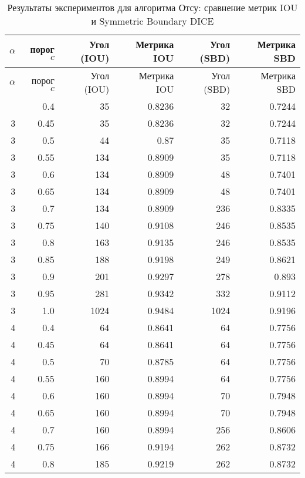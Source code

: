 
\begin{center}
\begin{longtable}{|r|r|r|r|r|r|}
\caption{Результаты экспериментов для алгоритма Отсу: сравнение метрик IOU и Symmetric Boundary DICE} 
\label{tab:otsu-split} \\
\hline
\(\alpha\) & порог \(c\) & Угол (IOU) & Метрика IOU & Угол (SBD) & Метрика SBD \\
\hline
\endfirsthead

\hline
\(\alpha\) & порог \(c\) & Угол (IOU) & Метрика IOU & Угол (SBD) & Метрика SBD \\
\hline
\endhead

\hline
\endfoot

\hline
\endlastfoot
3 & 0.4 & 35 & 0.8236 & 32 & 0.7244 \\
\hline
3 & 0.45 & 35 & 0.8236 & 32 & 0.7244 \\
\hline
3 & 0.5 & 44 & 0.87 & 35 & 0.7118 \\
\hline
3 & 0.55 & 134 & 0.8909 & 35 & 0.7118 \\
\hline
3 & 0.6 & 134 & 0.8909 & 48 & 0.7401 \\
\hline
3 & 0.65 & 134 & 0.8909 & 48 & 0.7401 \\
\hline
3 & 0.7 & 134 & 0.8909 & 236 & 0.8335 \\
\hline
3 & 0.75 & 140 & 0.9108 & 246 & 0.8535 \\
\hline
3 & 0.8 & 163 & 0.9135 & 246 & 0.8535 \\
\hline
3 & 0.85 & 188 & 0.9198 & 249 & 0.8621 \\
\hline
3 & 0.9 & 201 & 0.9297 & 278 & 0.893 \\
\hline
3 & 0.95 & 281 & 0.9342 & 332 & 0.9112 \\
\hline
3 & 1.0 & 1024 & 0.9484 & 1024 & 0.9196 \\
\hline
4 & 0.4 & 64 & 0.8641 & 64 & 0.7756 \\
\hline
4 & 0.45 & 64 & 0.8641 & 64 & 0.7756 \\
\hline
4 & 0.5 & 70 & 0.8785 & 64 & 0.7756 \\
\hline
4 & 0.55 & 160 & 0.8994 & 64 & 0.7756 \\
\hline
4 & 0.6 & 160 & 0.8994 & 70 & 0.7948 \\
\hline
4 & 0.65 & 160 & 0.8994 & 70 & 0.7948 \\
\hline
4 & 0.7 & 160 & 0.8994 & 256 & 0.8606 \\
\hline
4 & 0.75 & 166 & 0.9194 & 262 & 0.8732 \\
\hline
4 & 0.8 & 185 & 0.9219 & 262 & 0.8732 \\

\end{longtable}
\end{center}

